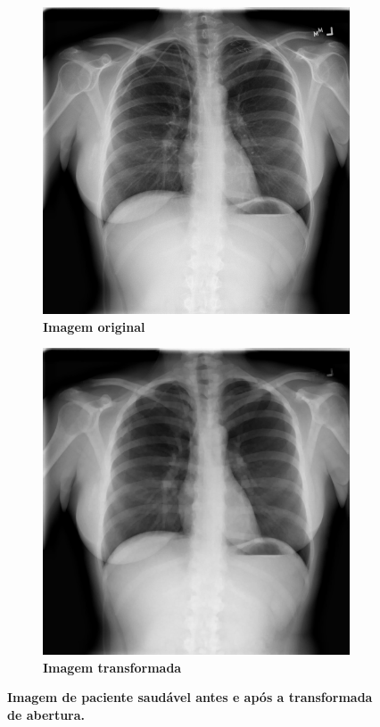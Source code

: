 \documentclass[
12pt,        %
oneside,     %
a4paper,     %
english,       %
brazil        %
%
%
]{ppgca}
\begin{document}
\begin{figure}[H]
\centering
    \begin{subfigure}[b]{0.45\textwidth}
        \includegraphics[width=\textwidth]{saudavel2.png}
        \centering
        \caption{\textbf{Imagem original}}
        \label{fig:saudavel2antes}
    \end{subfigure}
    \hfill
    \begin{subfigure}[b]{0.45\textwidth}
        \includegraphics[width=\textwidth]{saudavel2opening.png}
        \centering
        \caption{\textbf{{Imagem transformada}}}
        \label{fig:saudavel2opening}
    \end{subfigure}
    \caption{\textbf{{Imagem de paciente saudável antes e após a transformada de abertura.}}}
    \label{fig:saudavelopening}
\end{figure}
\end{document}
